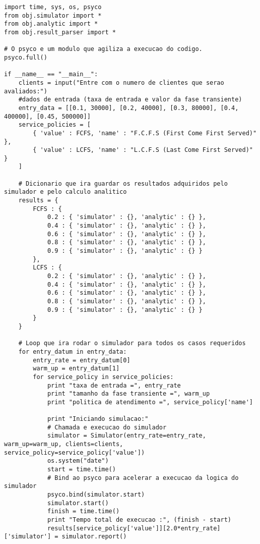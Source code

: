 \begin{lstlisting}
import time, sys, os, psyco
from obj.simulator import *
from obj.analytic import *
from obj.result_parser import *

# O psyco e um modulo que agiliza a execucao do codigo.
psyco.full()

if __name__ == "__main__":
    clients = input("Entre com o numero de clientes que serao avaliados:")
    #dados de entrada (taxa de entrada e valor da fase transiente)
    entry_data = [[0.1, 30000], [0.2, 40000], [0.3, 80000], [0.4, 400000], [0.45, 500000]]
    service_policies = [
        { 'value' : FCFS, 'name' : "F.C.F.S (First Come First Served)" },
        { 'value' : LCFS, 'name' : "L.C.F.S (Last Come First Served)"  }
    ]
    
    # Dicionario que ira guardar os resultados adquiridos pelo simulador e pelo calculo analitico
    results = {
        FCFS : {
            0.2 : { 'simulator' : {}, 'analytic' : {} },
            0.4 : { 'simulator' : {}, 'analytic' : {} },
            0.6 : { 'simulator' : {}, 'analytic' : {} },
            0.8 : { 'simulator' : {}, 'analytic' : {} },
            0.9 : { 'simulator' : {}, 'analytic' : {} }
        },
        LCFS : {
            0.2 : { 'simulator' : {}, 'analytic' : {} },
            0.4 : { 'simulator' : {}, 'analytic' : {} },
            0.6 : { 'simulator' : {}, 'analytic' : {} },
            0.8 : { 'simulator' : {}, 'analytic' : {} },
            0.9 : { 'simulator' : {}, 'analytic' : {} }
        }        
    }
    
    # Loop que ira rodar o simulador para todos os casos requeridos
    for entry_datum in entry_data:
        entry_rate = entry_datum[0]
        warm_up = entry_datum[1]
        for service_policy in service_policies:
            print "taxa de entrada =", entry_rate
            print "tamanho da fase transiente =", warm_up
            print "politica de atendimento =", service_policy['name']
            
            print "Iniciando simulacao:"
            # Chamada e execucao do simulador
            simulator = Simulator(entry_rate=entry_rate, warm_up=warm_up, clients=clients, service_policy=service_policy['value'])
            os.system("date")
            start = time.time()
            # Bind ao psyco para acelerar a execucao da logica do simulador
            psyco.bind(simulator.start)
            simulator.start()
            finish = time.time()
            print "Tempo total de execucao :", (finish - start)
            results[service_policy['value']][2.0*entry_rate]['simulator'] = simulator.report()
                                            

\end{lstlisting}
